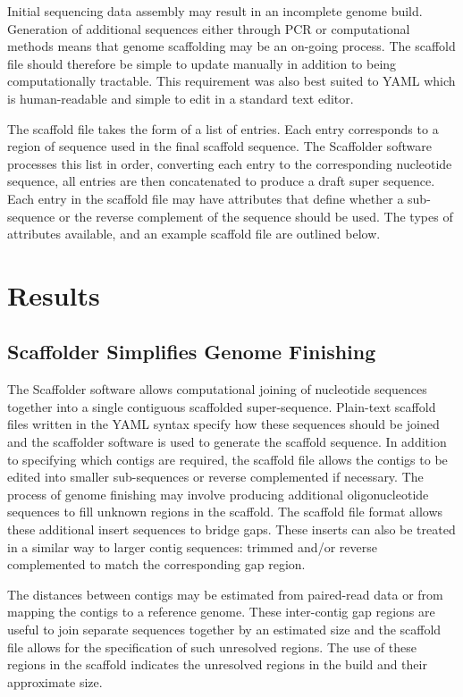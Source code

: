 \documentclass[10pt]{bmc_article}
\newenvironment{bmcformat}{\begin{raggedright}\baselineskip20pt\sloppy\setboolean{publ}{false}}{\end{raggedright}\baselineskip20pt\sloppy}
\begin{document}
\begin{bmcformat}
Initial sequencing data assembly may result in an incomplete genome build.
Generation of additional sequences either through PCR or computational methods
means that genome scaffolding may be an on-going process. The scaffold file
should therefore be simple to update manually in addition to being
computationally tractable. This requirement was also best suited to YAML which
is human-readable and simple to edit in a standard text editor. \pb

The scaffold file takes the form of a list of entries. Each entry corresponds
to a region of sequence used in the final scaffold sequence. The Scaffolder
software processes this list in order, converting each entry to the
corresponding nucleotide sequence, all entries are then concatenated to produce
a draft super sequence. Each entry in the scaffold file may have attributes
that define whether a sub-sequence or the reverse complement of the sequence
should be used. The types of attributes available, and an example scaffold file
are outlined below. \pb

\clearpage

\section*{Results} %

\subsection*{Scaffolder Simplifies Genome Finishing} %

The Scaffolder software allows computational joining of nucleotide sequences
together into a single contiguous scaffolded super-sequence. Plain-text
scaffold files written in the YAML syntax specify how these sequences should be
joined and the scaffolder software is used to generate the scaffold sequence.
In addition to specifying which contigs are required, the scaffold file allows
the contigs to be edited into smaller sub-sequences or reverse complemented if
necessary. The process of genome finishing may involve producing additional
oligonucleotide sequences to fill unknown regions in the scaffold. The scaffold
file format allows these additional insert sequences to bridge gaps. These
inserts can also be treated in a similar way to larger contig sequences:
trimmed and/or reverse complemented to match the corresponding gap region. \pb

The distances between contigs may be estimated from paired-read data or from
mapping the contigs to a reference genome. These inter-contig gap regions are
useful to join separate sequences together by an estimated size and the
scaffold file allows for the specification of such unresolved regions. The use
of these regions in the scaffold indicates the unresolved regions in the build
and their approximate size. \pb


\end{bmcformat}
\end{document}
